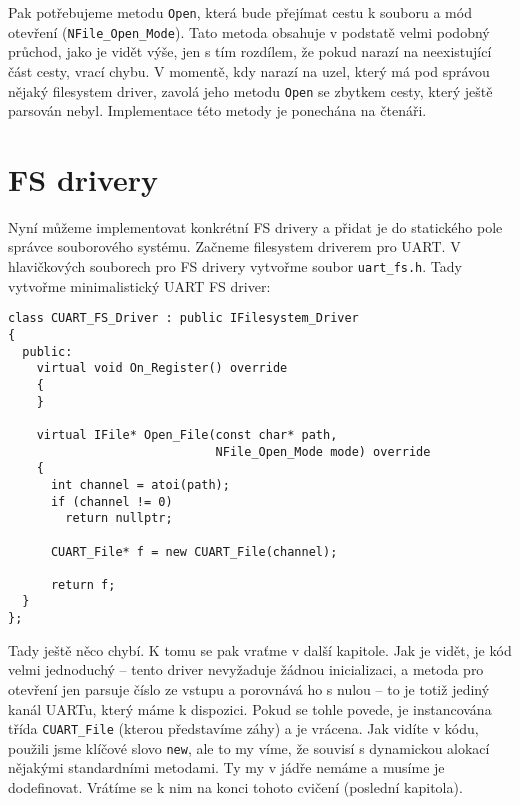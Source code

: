 \documentclass{article}
\begin{document}
Pak potřebujeme metodu \texttt{Open}, která bude přejímat cestu k souboru a mód otevření (\texttt{NFile\_Open\_Mode}). Tato metoda obsahuje v podstatě velmi podobný průchod, jako je vidět výše, jen s tím rozdílem, že pokud narazí na neexistující část cesty, vrací chybu. V momentě, kdy narazí na uzel, který má pod správou nějaký filesystem driver, zavolá jeho metodu \texttt{Open} se zbytkem cesty, který ještě parsován nebyl. Implementace této metody je ponechána na čtenáři.

\section{FS drivery}

Nyní můžeme implementovat konkrétní FS drivery a přidat je do statického pole správce souborového systému. Začneme filesystem driverem pro UART. V hlavičkových souborech pro FS drivery vytvořme soubor \texttt{uart\_fs.h}. Tady vytvořme minimalistický UART FS driver:
\begin{lstlisting}
class CUART_FS_Driver : public IFilesystem_Driver
{
  public:
    virtual void On_Register() override
    {
    }

    virtual IFile* Open_File(const char* path,
                             NFile_Open_Mode mode) override
    {
      int channel = atoi(path);
      if (channel != 0)
        return nullptr;

      CUART_File* f = new CUART_File(channel);

      return f;
  }
};
\end{lstlisting}
Tady ještě něco chybí. K tomu se pak vraťme v další kapitole. Jak je vidět, je kód velmi jednoduchý -- tento driver nevyžaduje žádnou inicializaci, a metoda pro otevření jen parsuje číslo ze vstupu a porovnává ho s nulou -- to je totiž jediný kanál UARTu, který máme k dispozici. Pokud se tohle povede, je instancována třída \texttt{CUART\_File} (kterou představíme záhy) a je vrácena. Jak vidíte v kódu, použili jsme klíčové slovo \texttt{new}, ale to my víme, že souvisí s dynamickou alokací nějakými standardními metodami. Ty my v jádře nemáme a musíme je dodefinovat. Vrátíme se k nim na konci tohoto cvičení (poslední kapitola).
\end{document}
